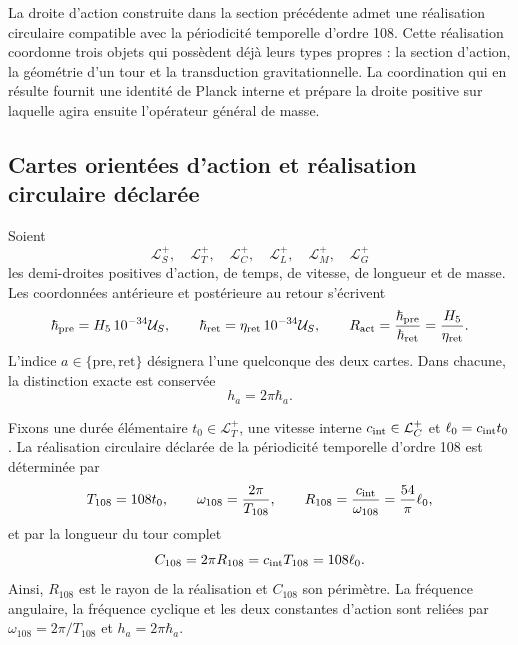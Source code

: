 \label{mdg:sec:identidad-autodual-planck-ct108-rev3}

La droite d’action construite dans la section précédente admet une
réalisation circulaire compatible avec la périodicité temporelle d’ordre 108.
Cette réalisation coordonne trois objets qui possèdent déjà leurs types propres : la
section d’action, la géométrie d’un tour et la transduction
gravitationnelle. La coordination qui en résulte fournit une identité de
Planck interne et prépare la droite positive sur laquelle agira ensuite
l’opérateur général de masse.

\subsection{Cartes orientées d’action et réalisation circulaire déclarée}

Soient
\[
 \mathcal L_S^+,\quad \mathcal L_T^+,\quad \mathcal L_C^+,
 \quad \mathcal L_L^+,\quad \mathcal L_M^+,\quad \mathcal L_G^+
\]
les demi-droites positives d’action, de temps, de vitesse, de longueur et de masse.
Les coordonnées antérieure et postérieure au retour s’écrivent
\begin{equation}
 \hbar_{\rm pre}=H_5\,10^{-34}\mathcal U_S,
 \qquad
 \hbar_{\rm ret}=\eta_{\rm ret}\,10^{-34}\mathcal U_S,
 \qquad
 R_{\rm act}=\frac{\hbar_{\rm pre}}{\hbar_{\rm ret}}
 =\frac{H_5}{\eta_{\rm ret}}.
 \label{mdg:eq:planck-ct108-cartas-pre-ret-rev3}
\end{equation}
L’indice \(a\in\{\mathrm{pre},\mathrm{ret}\}\) désignera l’une quelconque
des deux cartes. Dans chacune, la distinction exacte est conservée
\begin{equation}
 h_a=2\pi\hbar_a .
 \label{mdg:eq:planck-ct108-h-hbar-rev3}
\end{equation}

Fixons une durée élémentaire \(t_0\in\mathcal L_T^+\), une vitesse
interne \(c_{\rm int}\in\mathcal L_C^+\) et
\(\ell_0=c_{\rm int}t_0\). La réalisation circulaire déclarée de la
périodicité temporelle d’ordre 108 est déterminée par
\begin{equation}
 T_{108}=108t_0,
 \qquad
 \omega_{108}=\frac{2\pi}{T_{108}},
 \qquad
 R_{108}=\frac{c_{\rm int}}{\omega_{108}}
 =\frac{54}{\pi}\ell_0,
 \label{mdg:eq:planck-ct108-realizacion-circular-rev3}
\end{equation}
et par la longueur du tour complet
\begin{equation}
 C_{108}=2\pi R_{108}=c_{\rm int}T_{108}=108\ell_0.
 \label{mdg:eq:planck-ct108-perimetro-rev3}
\end{equation}
Ainsi, \(R_{108}\) est le rayon de la réalisation et \(C_{108}\) son
périmètre. La fréquence angulaire, la fréquence cyclique et les deux
constantes d’action sont reliées par
\(\omega_{108}=2\pi/T_{108}\) et \(h_a=2\pi\hbar_a\).

